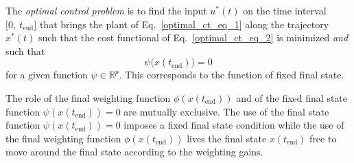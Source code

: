 \documentclass[12pt,a4paper,oneside]{book}
\begin{document}
\begin{onehalfspace}
The \textit{optimal control problem} is to find the input $u^*(t)$ on the time 
interval $\big[0,\ t_{\text{end}}\big]$ that brings the plant of 
Eq.~\eqref{optimal_ct_eq_1} along the trajectory $x^*(t)$ such that the cost 
functional of Eq.~\eqref{optimal_ct_eq_2} is minimized \textit{and} such that 
\begin{equation}\label{optimal_ct_eq_3}
	\psi\big(x(t_{\text{end}})\big)=0
\end{equation}
for a given function $\psi\in\mathbb{R}^p$. This corresponds to the function of 
fixed final state.

The role of the final weighting function $\phi(x(t_{\text{end}}))$ and of the 
fixed final state function $\psi(x(t_{\text{end}}))=0$ are mutually exclusive. 
The use of the final state function $\psi(x(t_{\text{end}}))=0$ imposes a fixed 
final state condition while the use of the final weighting function 
$\phi(x(t_{\text{end}}))$ lives the final state $x(t_{\text{end}})$ free to 
move around the final state according to the weighting gains.


\end{onehalfspace}
\end{document}
